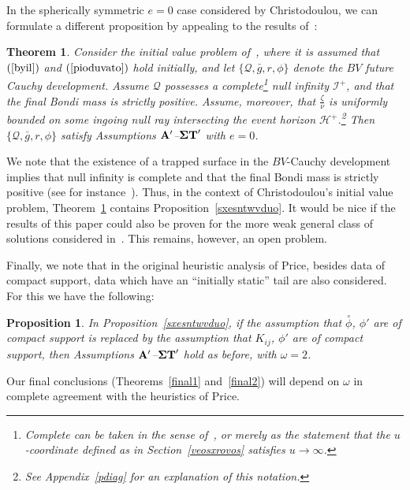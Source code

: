 \documentclass{article}
\newtheorem{theorem}{Theorem}[section]
\newtheorem{proposition}{Proposition}[section]
\begin{document}
In the spherically symmetric $e=0$ case considered by Christodoulou,
we can formulate a different proposition by
appealing to the results of~\cite{chr:mt}:
\begin{theorem}
\label{touxristodoulou}
Consider the initial
value problem of~\cite{chr:bv}, where it is assumed
that $(\ref{byil})$ and $(\ref{pioduvato})$ hold initially,
and let $\{\mathcal{Q}, \bar{g}, r, \phi\}$ denote the $BV$
future Cauchy development. Assume $\mathcal{Q}$ possesses a
complete\footnote{Complete can be taken in the sense of~\cite{chr:givp},
or merely as the statement that the $u$-coordinate defined as in 
Section~\ref{veosxrovos} satisfies
$u\to\infty$.} null infinity $\mathcal{I}^+$, and that the final Bondi mass
is strictly positive. Assume, moreover, that $\frac\zeta\nu$ is uniformly 
bounded on some ingoing null ray intersecting the event horizon
$\mathcal{H}^+$.\footnote{See Appendix~\ref{pdiag} for
an explanation of this notation.}
Then
$\{\mathcal{Q}, \bar{g},r,\phi\}$ satisfy
Assumptions ${\bf A}'$--${\bf \Sigma T}'$ with $e=0$.
\end{theorem}
We note that the existence of a trapped surface in the $BV$-Cauchy development
implies that null infinity is complete and that the final Bondi mass is
strictly positive (see for instance~\cite{md:sssts}). Thus, in the context
of Christodoulou's initial value problem, Theorem~\ref{touxristodoulou} contains
Proposition~\ref{sxesntwvduo}.
It would be nice if the results of this paper could also
be proven for the more weak general class of solutions considered
in~\cite{chr:mt}. This remains, however, an open problem.

Finally, we note that in 
the original heuristic analysis of Price, besides
data of compact support, data which have an ``initially static'' tail
are also considered. For this
we have the following:
\begin{proposition}
In Proposition~\ref{sxesntwvduo}, 
if the assumption that $\stackrel{\circ}\phi$, $\phi'$ are of
compact support is replaced by the assumption that $K_{ij}$, $\phi'$ are of compact
support, then Assumptions ${\bf A}'$--${\bf \Sigma T}'$ hold as before, 
with $\omega=2$. 
\end{proposition}
Our final conclusions (Theorems~\ref{final1} 
and~\ref{final2}) will depend on $\omega$
in complete agreement with the heuristics of Price.
\end{document}
